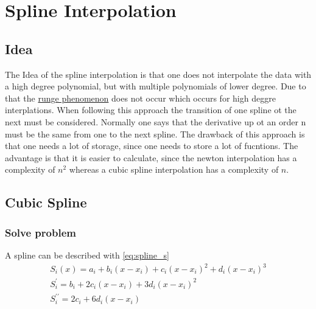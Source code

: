 \section{Spline Interpolation}
\subsection{Idea}
The Idea of the spline interpolation is that one does not interpolate the data with a high degree polynomial, but with multiple polynomials of lower degree. Due to that the \href{https://en.wikipedia.org/wiki/Runge%27s_phenomenon}{runge phenomenon}  does not occur which occurs for high deggre interplations. When following this approach the transition of one spline ot the next must be considered. Normally one says that the derivative up ot an order n must be the same from one to the next spline. The drawback of this approach is that one needs a lot of storage, since one needs to store a lot of fucntions. The advantage is that it is easier to calculate, since the newton interpolation has a complexity of $n^2$ whereas a cubic spline interpolation has a complexity of $n$.
\subsection{Cubic Spline}
\subsubsection{Solve problem}
A spline can be described with \autoref{eq:spline_s}
\begin{equation}\label{eq:spline_s}
\begin{gathered}
S_{i}(x)=a_{i}+b_{i}\left(x-x_{i}\right)+c_{i}\left(x-x_{i}\right)^{2}+d_{i}\left(x-x_{i}\right)^{3} \\
S_{i}^{\prime}=b_{i}+2 c_{i}\left(x-x_{i}\right)+3 d_{i}\left(x-x_{i}\right)^{2} \\
S_{i}^{\prime \prime}=2 c_{i}+6 d_{i}\left(x-x_{i}\right)
\end{gathered}
\end{equation}


